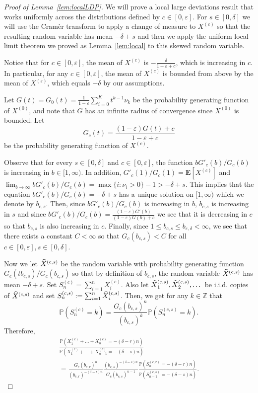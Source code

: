 \documentclass[10pt]{amsart}
\theoremstyle{definition}\newtheorem{defi}[theo]{Definition}\newtheorem{rema}[theo]{Remark}\newtheorem{exam}[theo]{Example}\newtheorem{exem}[theo]{Example}\newtheorem{nota}[theo]{Notation}
\newcommand{\Z}{\mathbb{Z}}
\renewcommand{\P}{\mathbb{P}}
\newcommand{\E}[1]{{\mathbf E}\left[#1\right]}
\providecommand{\eps}{}
\renewcommand{\eps}{\varepsilon}
\let\oldhat\hat
\renewcommand*{\hat}[1]{\mathchoice{\widehat{#1}}{\widehat{#1}}{\oldhat{#1}}{\oldhat{#1}}}
\begin{document}
\begin{proof}[Proof of Lemma~\ref{lem:localLDP}]
We will prove a local large deviations result that works uniformly across the distributions defined by $c\in [0,\eps]$. For $s\in [0,\delta]$ we will use the Cramèr transform to apply a change of measure to $X^{(c)}$ so that the resulting random variable has mean $-\delta+s$ and then we apply the uniform local limit theorem we proved as Lemma~\ref{lem:local} to this skewed random variable.

Notice that for $c\in [0,\varepsilon]$, the mean of $X^{(c)}$ is $- \frac{\delta}{1-\varepsilon+c}$, which is increasing in $c$. In particular, for any $c\in [0,\varepsilon]$, the mean of $X^{(c)}$ is bounded from above by the mean of $X^{(\varepsilon)}$, which equals $-\delta$ by our assumptions.

Let $G(t)=G_0(t)=\frac{1}{1-\varepsilon}\sum_{i=0}^K t^{k-1} \nu_k$ be the probability generating function of $X^{(0)}$, and note that $G$ has an infinite radius of convergence since $X^{(0)}$ is bounded. Let
\[
G_c(t)=\frac{(1-\varepsilon)G(t)+{c}}{1-\varepsilon+c}
\]
be the probability generating function of $X^{(c)}$.


Observe that for every $s\in[0,\delta]$ and $c\in [0,\varepsilon]$, {the function ${bG'_c(b)}/{G_c(b)}$ is increasing in $b\in[1,\infty)$. In addition, ${G'_c(1)}/{G_c(1)}=\E{X^{(c)}}$ and $\lim_{b\to\infty}{bG'_c(b)}/{G_c(b)}=\max\{i:\nu_i>0\}-1>-\delta+s$. This implies that} the equation ${bG'_c(b)}/{G_c(b)}=-\delta+s$ has a unique solution on $[1,\infty)$ which we denote by $b_{c,s}$. {Then, since ${bG'_c(b)}/{G_c(b)}$ is increasing in $b$, $b_{c,s}$ is increasing in $s$ and since ${bG'_c(b)}/{G_c(b)}=\frac{(1-\varepsilon)G'(b)}{(1-\varepsilon)G(b)+c}$ we see that it is decreasing in $c$ so that $b_{c,s}$ is also increasing in $c$.} {Finally, since $1\leq b_{c,s}\leq b_{\varepsilon,\delta}<\infty$, we see that there exists a constant $C<\infty$ so that $G_c(b_{c,s})<C$ for all $c\in [0,\varepsilon], s\in [0,\delta].$}

Now we let $\hat{X}^{(c,s)}$ be the random variable with probability generating function ${G_c(t b_{c,s})}/{G_c(b_{c,s})}$ so that by definition of $b_{c,s}$, the random variable $\hat{X}^{(c,s)}$ has mean $-\delta+s$. Set $S^{(c)}_n=\sum_{i=1}^n X^{(c)}_i$. Also let $\hat{X}^{(c,s)}_1, \hat{X}^{(c,s)}_2,\dots$ be i.i.d. copies of $\hat{X}^{(c,s)}$ and set $S^{(c,s)}_n:=\sum_{i=1}^n \hat{X}^{(c,s)}_i$. Then, we get for any $k\in \Z$ that
\[
\P\left(S^{(c)}_n=k\right)= \frac{G_c(b_{c,s})^n }{ (b_{c,s})^k}\P\left(S^{(c,s)}_n=k\right).
\]
Therefore,
\begin{multline}\label{eq:ratio_local_LDP}
\frac{\P\left(X^{(c)}_1+\dots+X^{(c)}_{n}= -(\delta-r)n\right)}{
\P\left(X^{(c)}_1+\dots+X^{(c)}_{n-1}=-(\delta-s)n\right)}\\
=\frac{G_c(b_{c,r})^n }{ (b_{c,r})^{ -(\delta-r)n }} \frac{ (b_{c,s})^{ -(\delta-s)n}}{ G_c(b_{c,s})^{n-1}} \frac{\P\left(S^{(c,r)}_n=-(\delta-r)n\right)}{ \P\left(S^{(c,s)}_{n-1}=-(\delta-s)n\right)}.
\end{multline}


\end{proof}
\end{document}
